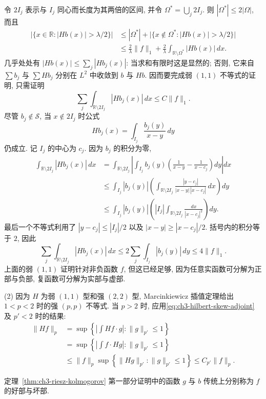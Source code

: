 \begin{Proof}
\hypertarget{chapter-03-page-065}{}
令 $2I_j$ 表示与 $I_j$ 同心而长度为其两倍的区间, 并令 $\Omega^*=\bigcup_j2I_j$. 则 $|\Omega^*|\le2|\Omega|$, 而且
\[
\begin{aligned}
 \bigl|\{x\in\mathbb R:|Hb(x)|>\lambda/2\}\bigr|
 &\le|\Omega^*|+\bigl|\{x\notin\Omega^*:|Hb(x)|>\lambda/2\}\bigr|\\
 &\le\frac2\lambda\|f\|_1+\frac2\lambda\int_{\mathbb R\setminus\Omega^*}|Hb(x)|\,dx.
\end{aligned}
\]
几乎处处有 $|Hb(x)|\le\sum_j|Hb_j(x)|$: 当求和有限时这是显然的; 否则, 它来自 $\sum b_j$ 与 $\sum Hb_j$ 分别在 $L^2$ 中收敛到 $b$ 与 $Hb$. 因而要完成弱 $(1,1)$ 不等式的证明, 只需证明
\[
 \sum_j\int_{\mathbb R\setminus2I_j}|Hb_j(x)|\,dx\le C\|f\|_1.
\]
尽管 $b_j\notin\mathcal S$, 当 $x\notin2I_j$ 时公式
\[
 Hb_j(x)=\int_{I_j}\frac{b_j(y)}{x-y}\,dy
\]
仍成立. 记 $I_j$ 的中心为 $c_j$. 因为 $b_j$ 的积分为零,
\[
\begin{aligned}
 \int_{\mathbb R\setminus2I_j}|Hb_j(x)|\,dx
 &=\int_{\mathbb R\setminus2I_j}
   \left|\int_{I_j}b_j(y)\left(\frac1{x-y}-\frac1{x-c_j}\right)dy\right|dx\\
 &\le\int_{I_j}|b_j(y)|
   \left(\int_{\mathbb R\setminus2I_j}
   \frac{|y-c_j|}{|x-y|\,|x-c_j|}\,dx\right)dy\\
 &\le\int_{I_j}|b_j(y)|
   \left(|I_j|\int_{\mathbb R\setminus2I_j}
   \frac{dx}{|x-c_j|^2}\right)dy.
\end{aligned}
\]
最后一个不等式利用了 $|y-c_j|\le|I_j|/2$ 以及 $|x-y|\ge|x-c_j|/2$. 括号内的积分等于 $2$, 因此
\[
 \sum_j\int_{\mathbb R\setminus2I_j}|Hb_j(x)|\,dx
 \le2\sum_j\int_{I_j}|b_j(y)|\,dy\le4\|f\|_1.
\]
上面的弱 $(1,1)$ 证明针对非负函数 $f$, 但这已经足够, 因为任意实函数可分解为正部与负部, 复函数可分解为实部与虚部.

\hypertarget{chapter-03-page-066}{}
(2) 因为 $H$ 为弱 $(1,1)$ 型和强 $(2,2)$ 型, Marcinkiewicz 插值定理给出 $1<p<2$ 时的强 $(p,p)$ 不等式. 当 $p>2$ 时, 应用\eqref{eq:ch3-hilbert-skew-adjoint} 及 $p'<2$ 时的结果:
\[
\begin{aligned}
 \|Hf\|_p
 &=\sup\left\{\left|\int Hf\cdot g\right|:\|g\|_{p'}\le1\right\}\\
 &=\sup\left\{\left|\int f\cdot Hg\right|:\|g\|_{p'}\le1\right\}\\
 &\le\|f\|_p\sup\left\{\|Hg\|_{p'}:\|g\|_{p'}\le1\right\}
 \le C_{p'}\|f\|_p.
\end{aligned}
\]
\end{Proof}

定理~\ref{thm:ch3-riesz-kolmogorov} 第一部分证明中的函数 $g$ 与 $b$ 传统上分别称为 $f$ 的好部与坏部.

